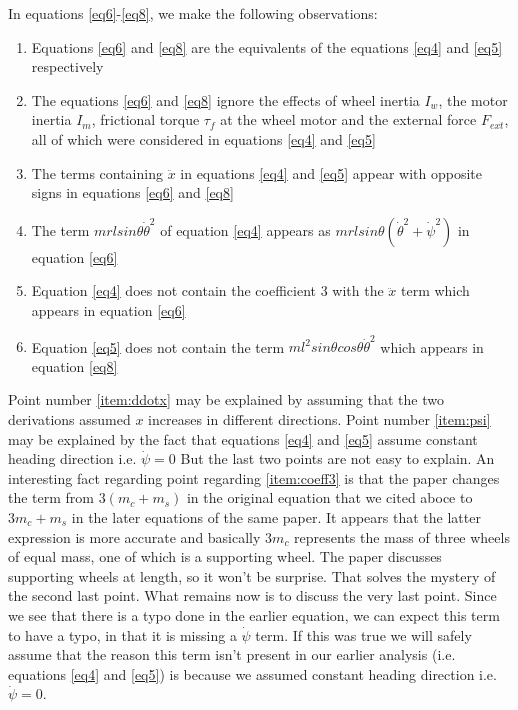 \documentclass[a4paper,10pt]{article}
\begin{document}
In equations \ref{eq6}-\ref{eq8}, we make the following observations:
\begin{enumerate}[label=(\roman*)]
 \item Equations \ref{eq6} and \ref{eq8} are the equivalents of the equations \ref{eq4} and \ref{eq5} respectively
 \item The equations \ref{eq6} and \ref{eq8} ignore the effects of wheel inertia $I_w$, the motor inertia $I_m$, frictional
 torque $\tau_f$ at the wheel motor and the external force $F_{ext}$, all of which were considered in equations \ref{eq4} and \ref{eq5}
 \item The terms containing $\ddot{x}$ in equations \ref{eq4} and \ref{eq5} appear with opposite signs in equations \ref{eq6} and \ref{eq8} \label{item:ddotx}
 \item The term $mrlsin\theta{\dot\theta}^2$ of equation \ref{eq4} appears as $mrlsin\theta({\dot\theta}^2+{\dot\psi}^2)$ in equation \ref{eq6} \label{item:psi}
 \item Equation \ref{eq4} does not contain the coefficient $3$ with the $\ddot{x}$ term which appears in equation \ref{eq6} \label{item:coeff3}
 \item Equation \ref{eq5} does not contain the term $ml^2sin\theta cos\theta {\dot{\theta}}^2$ which appears in equation \ref{eq8} \label{item:corriolis}
\end{enumerate}

 Point number \ref{item:ddotx} may be explained by assuming that the two derivations assumed $x$ increases in different directions.
Point number \ref{item:psi} may be explained by the fact that equations \ref{eq4} and \ref{eq5} assume constant heading direction i.e. $\dot\psi=0$
But the last two points are not easy to explain. An interesting fact regarding point regarding \ref{item:coeff3} is that the paper \cite{kim2005dynamic}
changes the term from $3(m_c+m_s)$ in the original equation that we cited aboce to $3m_c+m_s$ in the later equations of the same paper. It appears that
the latter expression is more accurate and basically $3m_c$ represents the mass of three wheels of equal mass, one of which is a supporting wheel.
The paper discusses supporting wheels at length, so it won't be surprise. That solves the mystery of the second last point. What remains now is to
discuss the very last point. Since we see that there is a typo done in the earlier equation, we can expect this term to have a typo, in that it
is missing a $\dot\psi$ term. If this was true we will safely assume that the reason this term isn't present in our earlier analysis (i.e. equations 
\ref{eq4} and \ref{eq5}) is because we assumed constant heading direction i.e. $\dot{\psi}=0$.



\end{document}
